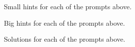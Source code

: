 \begin{smallhint}
\ba
	\item Small hints for each of the prompts above.
\ea
\end{smallhint}
\begin{bighint}
\ba
	\item Big hints for each of the prompts above.
\ea
\end{bighint}
\begin{activitySolution}
\ba
	\item Solutions for each of the prompts above.
\ea
\end{activitySolution}
\aftera